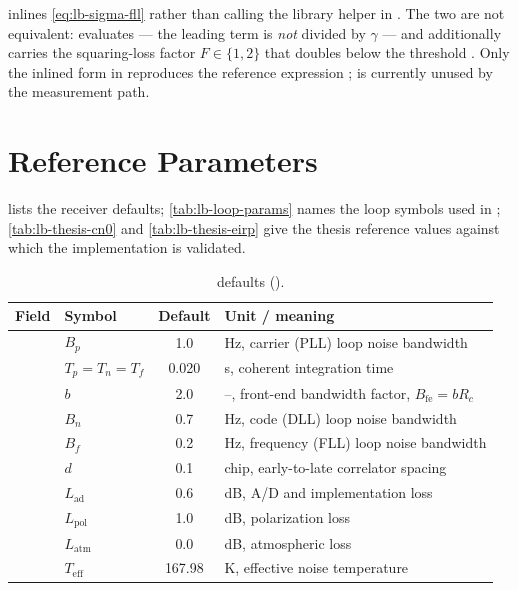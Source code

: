 \begin{lupntnote}
 inlines \cref{eq:lb-sigma-fll} rather than calling
the library helper  in
.  The two are not equivalent:
 evaluates
 --- the leading term is
\emph{not} divided by $\gamma$ --- and additionally carries the squaring-loss
factor $F \in \{1, 2\}$ that doubles below the threshold
.  Only the inlined form in 
reproduces the reference expression \citep{kaplan2017};  is
currently unused by the measurement path.
\end{lupntnote}

\section{Reference Parameters}
\label{sec:lb-params}

 lists the \lupnt{} receiver defaults;
\cref{tab:lb-loop-params} names the loop symbols used in
; \cref{tab:lb-thesis-cn0} and
\cref{tab:lb-thesis-eirp} give the thesis reference values against which the
implementation is validated.

\begin{table}[htbp]
  \centering
  \caption{ defaults
  ().}
  \label{tab:lb-rx-params}
  \begin{tabular}{l l S l}
    \toprule
    Field & Symbol & {Default} & Unit / meaning \\
    \midrule
        & $B_p$              & 1.0    & \si{\hertz}, carrier (PLL) loop noise bandwidth \\
         & $T_p = T_n = T_f$  & 0.020  & \si{\second}, coherent integration time \\
         & $b$                & 2.0    & --, front-end bandwidth factor, $B_\mathrm{fe} = b R_c$ \\
        & $B_n$              & 0.7    & \si{\hertz}, code (DLL) loop noise bandwidth \\
        & $B_f$              & 0.2    & \si{\hertz}, frequency (FLL) loop noise bandwidth \\
         & $d$                & 0.1    & chip, early-to-late correlator spacing \\
     & $L_\mathrm{ad}$    & 0.6    & \si{\dB}, A/D and implementation loss \\
    & $L_\mathrm{pol}$   & 1.0    & \si{\dB}, polarization loss \\
    & $L_\mathrm{atm}$   & 0.0    & \si{\dB}, atmospheric loss \\
    & $T_\mathrm{eff}$   & 167.98 & \si{\kelvin}, effective noise temperature \\
    \bottomrule
  \end{tabular}
\end{table}

